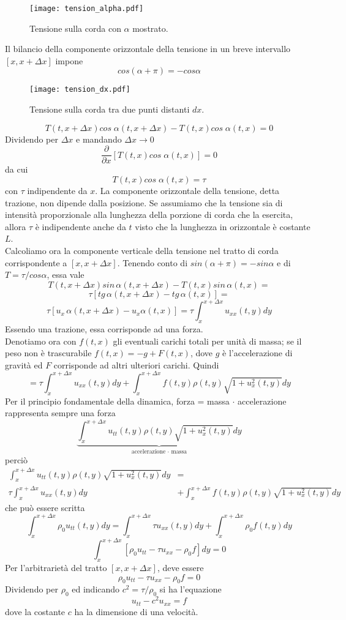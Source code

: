 \begin{figure}[H]
	\centering
	\texttt{[image: tension\_alpha.pdf]}
	\caption{Tensione sulla corda con $\alpha$ mostrato.}
	\label{tension_alpha}
\end{figure}
\noindent
Il bilancio della componente orizzontale della tensione in un breve intervallo
$[x,x+\Delta x]$ impone
\[
	cos(\alpha + \pi)= - cos \alpha
\]
\begin{figure}[H]
	\centering
	\texttt{[image: tension\_dx.pdf]}
	\caption{Tensione sulla corda tra due punti distanti $dx$.}
	\label{tension_dx}
\end{figure}
\[
	T(t, x + \Delta x) cos \; \alpha(t, x + \Delta x)-
	T(t,x)cos \; \alpha(t,x)=0
\]
Dividendo per $\Delta x$ e mandando $\Delta x \to 0$
\[
	\frac{\partial}{\partial x}[T(t,x) cos \; \alpha(t,x)]=0
\]
da cui
\[
	T(t,x) cos \; \alpha(t,x)= \tau
\]
con $\tau$ indipendente da $x$.
La componente orizzontale della tensione, detta trazione, non dipende dalla
posizione. Se assumiamo che la tensione sia di intensit\`a proporzionale
alla lunghezza della porzione di corda che la esercita, allora $\tau$ \`e
indipendente anche da $t$ visto che la lunghezza in orizzontale \`e costante
$L$.\\
Calcoliamo ora la componente verticale della tensione nel tratto di corda
corrispondente a $[x, x+ \Delta x]$. Tenendo conto di $sin(\alpha + \pi)= - sin
\alpha$ e di $T= \tau/cos\alpha$, essa vale
\[
	T(t,x+\Delta x)sin \, \alpha(t, x+ \Delta x) - T(t,x)sin \, \alpha
(t,x)=
\]
\[
	\tau[tg \, \alpha (t, x + \Delta x)- tg  \, \alpha(t,x)]=
\]
\[
	\tau[u_x \, \alpha (t, x + \Delta x)- u_x \alpha(t,x)]=
	\tau \int_x^{x+\Delta x} u_{xx}(t,y) dy
\]
Essendo una trazione, essa corrisponde ad una forza.\\
Denotiamo ora con $f(t,x)$ gli eventuali carichi totali per unit\`a di massa; se
il
peso non \`e trascurabile $f(t,x)= -g + F(t,x)$, dove $g$ \`e l'accelerazione
di gravit\`a ed $F$ corrisponde ad altri ulteriori carichi. Quindi
\[
	=\tau \int_x^{x+\Delta x} u_{xx}(t,y) dy +
	\int_x^{x+\Delta x} f(t,y) \rho (t,y) \sqrt{1+ u_x^2(t,y)} dy
\]
Per il principio fondamentale della dinamica, forza = massa $\cdot$
accelerazione rappresenta sempre una forza
\[
	\underbrace{\int_x^{x+\Delta x} u_{tt}(t,y) \rho (t,y) \sqrt{1+
u_x^2(t,y)} dy}_{
	\text{accelerazione $\cdot$ massa}}
\]
perci\`o
\begin{align*}
	\int_x^{x+\Delta x} u_{tt}(t,y) \rho (t,y) \sqrt{1+ u_x^2(t,y)} dy&= \\
	\tau \int_x^{x+\Delta x} u_{xx}(t,y) dy &+
	\int_x^{x+\Delta x} f(t,y) \rho (t,y) \sqrt{1+ u_x^2(t,y)} dy
\end{align*}
che pu\`o essere scritta
\[
	\int_x^{x+\Delta x}\rho_0 u_{tt}(t,y)  dy=
	\int_x^{x+\Delta x} \tau u_{xx}(t,y) dy +
	\int_x^{x+\Delta x} \rho_0 f(t,y)  dy
\]
\[
	\int_x^{x+\Delta x} \left[
	\rho_0 u_{tt} - \tau u_{xx}-  \rho_0 f
	\right]dy= 0
\]
Per l'arbitrariet\`a del tratto $[x, x+ \Delta x]$, deve essere
\[
	\rho_0 u_{tt} - \tau u_{xx}-  \rho_0 f =0
\]
Dividendo per $\rho_0$ ed indicando $c^2=\tau / \rho_0$ si ha l'equazione
\[
	u_{tt} - c^2 u_{xx} = f
\]
dove la costante $c$ ha la dimensione di una velocit\`a.
